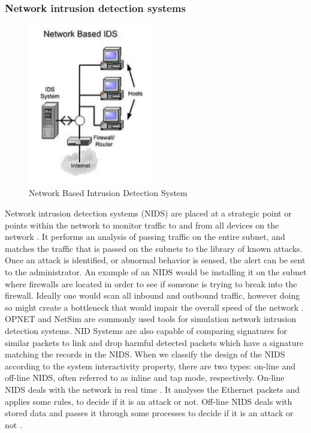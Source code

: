\documentclass[12pt]{article}
\theoremstyle{definition}
\begin{document}
			\subsubsection{Network intrusion detection systems}
			\begin{figure}[!h]
				\centering
				\includegraphics[height=200pt]{pictures/network-based-ids.png}
				\caption{Network Based Intrusion Detection System}
				\label{fig:network-ids}
			\end{figure}
			Network intrusion detection systems (NIDS) are placed at a strategic point or points within the network to monitor traffic to and from all devices on the network \cite{Bosman2017}. It performs an analysis of passing traffic on the entire subnet, and matches the traffic that is passed on the subnets to the library of known attacks. Once an attack is identified, or abnormal behavior is sensed, the alert can be sent to the administrator. An example of an NIDS would be installing it on the subnet where firewalls are located in order to see if someone is trying to break into the firewall. Ideally one would scan all inbound and outbound traffic, however doing so might create a bottleneck that would impair the overall speed of the network \cite{Lin2017}. OPNET and NetSim are commonly used tools for simulation network intrusion detection systems. NID Systems are also capable of comparing signatures for similar packets to link and drop harmful detected packets which have a signature matching the records in the NIDS. When we classify the design of the NIDS according to the system interactivity property, there are two types: on-line and off-line NIDS, often referred to as inline and tap mode, respectively. On-line NIDS deals with the network in real time \cite{Zarpelao2017}. It analyses the Ethernet packets and applies some rules, to decide if it is an attack or not. Off-line NIDS deals with stored data and passes it through some processes to decide if it is an attack or not \cite{Lin2017}.
			
\end{document}
